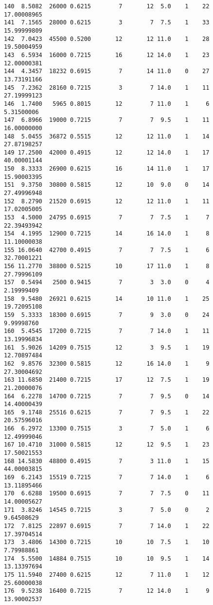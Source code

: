\documentclass[
  letterpaper,
  DIV=11,
  numbers=noendperiod]{scrreprt}
\begin{document}
\begin{verbatim}
140  8.5082  26000 0.6215        7       12  5.0    1    22 17.00008965
141  7.1565  28000 0.6215        3        7  7.5    1    33 15.99999809
142  7.0423  45500 0.5200       12       12 11.0    1    28 19.50004959
143  6.5934  16000 0.7215       16       12 14.0    1    23 12.00000381
144  4.3457  18232 0.6915        7       14 11.0    0    27 13.73191166
145  7.2362  28160 0.7215        3        7 14.0    1    11 27.19999123
146  1.7400   5965 0.8015       12        7 11.0    1     6  5.31500006
147  6.8966  19000 0.7215        7        7  9.5    1    11 16.00000000
148  5.0455  36872 0.5515       12       12 11.0    1    14 27.87198257
149 17.2500  42000 0.4915       12       12 14.0    1    17 40.00001144
150  8.3333  26900 0.6215       16       14 11.0    1    17 15.90003395
151  9.3750  30800 0.5815       12       10  9.0    0    14 27.49996948
152  8.2790  21520 0.6915       12       12 11.0    1    11 17.02005005
153  4.5000  24795 0.6915        7        7  7.5    1     7 22.39493942
154  4.1995  12900 0.7215       14       16 14.0    1     8 11.10000038
155 16.0640  42700 0.4915        7        7  7.5    1     6 32.70001221
156 11.2770  38800 0.5215       10       17 11.0    1     8 27.79996109
157  0.5494   2500 0.9415        7        3  3.0    0     4  2.19999409
158  9.5480  26921 0.6215       14       10 11.0    1    25 19.72095108
159  5.3333  18300 0.6915        7        9  3.0    0    24  9.99998760
160  5.4545  17200 0.7215        7        7 14.0    1    11 13.19996834
161  5.9026  14209 0.7515       12        3  9.5    1    19 12.70897484
162  9.8576  32300 0.5815       12       16 14.0    1     9 27.30004692
163 11.6850  21400 0.7215       17       12  7.5    1    19 21.20000076
164  6.2278  14700 0.7215        7        7  9.5    0    14 14.40000439
165  9.1748  25516 0.6215        7        7  9.5    1    22 20.57596016
166  6.2972  13300 0.7515        3        7  5.0    1     6 12.49999046
167 10.4710  31000 0.5815       12       12  9.5    1    23 17.50021553
168 14.5830  48800 0.4915        7        3 11.0    1    15 44.00003815
169  6.2143  15519 0.7215        7        7 14.0    1     6 13.11895466
170  6.6288  19500 0.6915        7        7  7.5    0    11 14.00005627
171  3.8246  14545 0.7215        3        7  5.0    0     2  9.64508629
172  7.8125  22897 0.6915        7        7 14.0    1    22 17.39704514
173  3.4806  14300 0.7215       10       10  7.5    1    10  7.79988861
174  5.5500  14884 0.7515       10       10  9.5    1    14 13.13397694
175 11.5940  27400 0.6215       12        7 11.0    1    12 25.60000038
176  9.5238  16400 0.7215        7       12 14.0    1     9 13.90002537

\end{verbatim}
\end{document}
